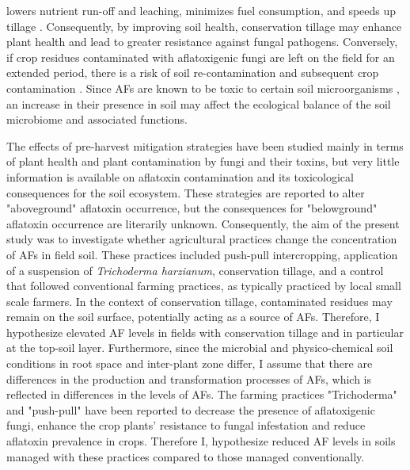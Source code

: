 \begin{refsection}
lowers nutrient run-off and leaching, minimizes fuel consumption, and speeds up tillage \citep{busari2015conservation}. Consequently, by improving soil health, conservation tillage may enhance plant health and lead to greater resistance against fungal pathogens. Conversely, if crop residues contaminated with aflatoxigenic fungi are left on the field for an extended period, there is a risk of soil re-contamination and subsequent crop contamination  \citep{fouche2020aflatoxins, accinelli2008aspergillus, angle1987aflatoxin}. Since AFs are known to be toxic to certain soil microorganisms \citep{burmeister1966survey, arai1967antimicrobial}, an increase in their presence in soil may affect the ecological balance of the soil microbiome and associated functions.


The effects of pre-harvest mitigation strategies have been studied mainly in terms of plant health and plant contamination by fungi and their toxins, but very little information is available on aflatoxin contamination and its toxicological consequences for the soil ecosystem. These strategies are reported to alter "aboveground" aflatoxin occurrence, but the consequences for "belowground" aflatoxin occurrence are literarily unknown. Consequently, the aim of the present study was to investigate whether agricultural practices change the concentration of AFs in field soil. These practices included push-pull intercropping, application of a suspension of \textit{Trichoderma harzianum}, conservation tillage, and a control that followed conventional farming practices, as typically practiced by local small scale farmers. In the context of conservation tillage, contaminated residues may remain on the soil surface, potentially acting as a source of AFs. Therefore, I hypothesize elevated AF levels in fields with conservation tillage and in particular at the top-soil layer. Furthermore, since the microbial and physico-chemical soil conditions in root space and inter-plant zone differ, I assume that there are differences in the production and transformation processes of AFs, which is reflected in differences in the levels of AFs. The farming practices "Trichoderma" and "push-pull" have been reported to decrease the presence of aflatoxigenic fungi, enhance the crop plants’ resistance to fungal infestation and reduce aflatoxin prevalence in crops. Therefore I, hypothesize reduced AF levels in soils managed with these practices compared to those managed conventionally.


\end{refsection}
